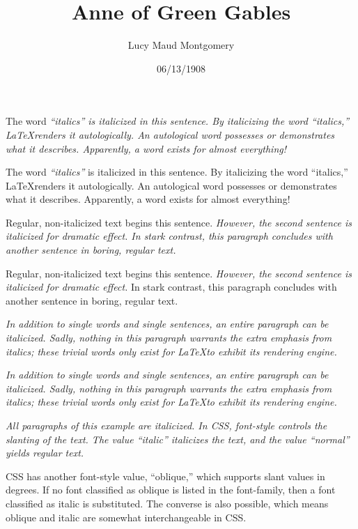 \documentclass[a4paper]{article}
\title{Anne of Green Gables}
\author{Lucy Maud Montgomery}
\date{06/13/1908}
\begin{document}
\maketitle

The word \itshape ``italics'' \upshape is italicized in this sentence. By italicizing the word ``italics,'' \LaTeX renders it autologically. An autological word possesses or demonstrates what it describes. Apparently, a word exists for almost everything!

The word {\itshape ``italics''} is italicized in this sentence. By italicizing the word ``italics,'' \LaTeX renders it autologically. An autological word possesses or demonstrates what it describes. Apparently, a word exists for almost everything!

Regular, non-italicized text begins this sentence. \itshape However, the second sentence is italicized for dramatic effect. \upshape In stark contrast, this paragraph  concludes with another sentence in boring, regular text.

Regular, non-italicized text begins this sentence. {\itshape However, the second sentence is italicized for dramatic effect.} In stark contrast, this paragraph concludes with another sentence in boring, regular text.

\itshape In addition to single words and single sentences, an entire paragraph can be italicized. Sadly, nothing in this paragraph warrants the extra emphasis from italics; these trivial words only exist for \LaTeX to exhibit its rendering engine. \upshape

{\itshape In addition to single words and single sentences, an entire paragraph can be italicized. Sadly, nothing in this paragraph warrants the extra emphasis from italics; these trivial words only exist for \LaTeX to exhibit its rendering engine.}

\itshape All paragraphs of this example are italicized. In CSS, font-style controls the slanting of the text. The value ``italic'' italicizes the text, and the value ``normal'' yields regular text.

CSS has another font-style value, ``oblique,'' which supports slant values in degrees. If no font classified as oblique is listed in the font-family, then a font classified as italic is substituted. The converse is also possible, which means oblique and italic are somewhat interchangeable in CSS. \upshape
\end{document}
